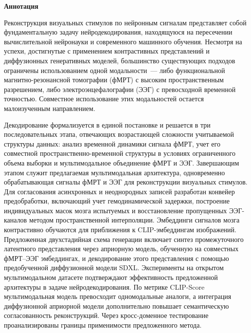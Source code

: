 \begin{center}
    \Large{\textbf{Аннотация}}
\end{center}

\begin{singlespace}
Реконструкция визуальных стимулов по нейронным сигналам представляет собой фундаментальную задачу нейродекодирования, находящуюся на пересечении вычислительной нейронауки и современного машинного обучения. Несмотря на успехи, достигнутые с применением контрастивных представлений и диффузионных генеративных моделей, большинство существующих подходов ограничены использованием одной модальности~--- либо функциональной магнитно-резонансной томографии (фМРТ) с высоким пространственным разрешением, либо электроэнцефалографии (ЭЭГ) с превосходной временной точностью. Совместное использование этих модальностей остается малоизученным направлением.

Декодирование формализуется в единой постановке и решается в три последовательных этапа, отвечающих возрастающей сложности учитываемой структуры данных: анализ временной динамики сигнала фМРТ, учет его совместной пространственно-временной структуры в условиях ограниченного объема выборки и мультимодальное объединение фМРТ и ЭЭГ. Завершающим этапом служит предлагаемая мультимодальная архитектура, одновременно обрабатывающая сигналы фМРТ и ЭЭГ для реконструкции визуальных стимулов. Для согласования асинхронных и неоднородных записей разработан конвейер предобработки, включающий учет гемодинамической задержки, построение индивидуальных масок мозга испытуемых и восстановление пропущенных ЭЭГ-каналов методом пространственной интерполяции. Эмбеддинги сигналов мозга контрастивно обучаются для приближения к CLIP-эмбеддингам изображений. Предложенная двухстадийная схема генерации включает синтез промежуточного латентного представления через априорную модель, обученную на совместных фМРТ--ЭЭГ эмбеддингах, и декодирование этого представления с помощью предобученной диффузионной модели SDXL. Эксперименты на открытом мультимодальном датасете подтверждают эффективность предложенной архитектуры в задаче нейродекодирования. По метрике CLIP-Score мультимодальная модель превосходит одномодальные аналоги, а интеграция диффузионной априорной модели дополнительно повышает семантическую согласованность реконструкций. Через кросс-доменное тестирование проанализированы границы применимости предложенного метода.
\end{singlespace}
